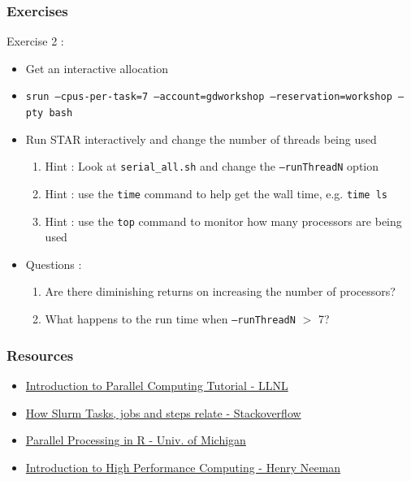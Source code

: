 \documentclass{beamer}
\newcommand{\code}[1]{\colorbox{codegray}{\texttt{#1}}}
\begin{document}


\begin{frame}
\frametitle{Exercises}
\small
Exercise 2 : 
\begin{itemize}
    \item Get an interactive allocation
    \pause
    \item \code{\tiny srun --cpus-per-task=7 --account=gdworkshop --reservation=workshop --pty bash}
    \pause
    \item Run STAR interactively and change the number of threads being used
    \pause
    \begin{enumerate}
        \item Hint : Look at \code{\scriptsize serial\_all.sh} and change the \code{\scriptsize --runThreadN} option
        \pause
        \item Hint : use the \code{time} command to help get the wall time, e.g. \code{time ls}
        \pause
        \item Hint : use the \code{top} command to monitor how many processors are being used
    \end{enumerate}
    \pause
    \item Questions :
    \begin{enumerate}
        \item Are there diminishing returns on increasing the number of processors?
        \pause
        \item What happens to the run time when \code{--runThreadN} $>$  7?  
    \end{enumerate}
\end{itemize}
\end{frame}


\begin{frame}
\frametitle{Resources}
\begin{itemize}
    \small
    \item \href{https://hpc.llnl.gov/documentation/tutorials/introduction-parallel-computing-tutorial}{\color{blue}Introduction to Parallel Computing Tutorial - LLNL}
    \item \href{https://stackoverflow.com/a/46532581/4021436}{\color{blue}How Slurm Tasks, jobs and steps relate - Stackoverflow}
    \item \href{https://dept.stat.lsa.umich.edu/~jerrick/courses/stat701/notes/parallel.html}{\color{blue}Parallel Processing in R - Univ. of Michigan}
    \item \href{https://shareok.org/bitstream/handle/11244/15465/sipe_overview.pdf?sequence=1&isAllowed=y}{\color{blue}Introduction to High Performance Computing - Henry Neeman}
    \bigskip
\end{itemize}
\end{frame}
\end{document}
